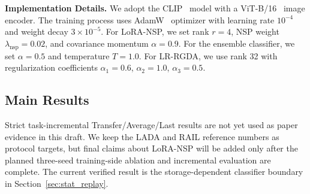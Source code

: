 \documentclass{article}
\begin{document}
\textbf{Implementation Details.}
We adopt the CLIP~\cite{radford2021learning} model with a ViT-B/16~\cite{dosovitskiy2021an} image encoder. The training process uses AdamW~\cite{loshchilov2019decoupled} optimizer with learning rate $10^{-4}$ and weight decay $3 \times 10^{-5}$. For LoRA-NSP, we set rank $r=4$, NSP weight $\lambda_{\text{nsp}}=0.02$, and covariance momentum $\alpha=0.9$. For the ensemble classifier, we set $\alpha=0.5$ and temperature $T=1.0$. For LR-RGDA, we use rank 32 with regularization coefficients $\alpha_1=0.6$, $\alpha_2=1.0$, $\alpha_3=0.5$.

\subsection{Main Results}

Strict task-incremental Transfer/Average/Last results are not yet used as paper evidence in this draft. We keep the LADA and RAIL reference numbers as protocol targets, but final claims about LoRA-NSP will be added only after the planned three-seed training-side ablation and incremental evaluation are complete. The current verified result is the storage-dependent classifier boundary in Section~\ref{sec:stat_replay}.

\iffalse
\end{document}
